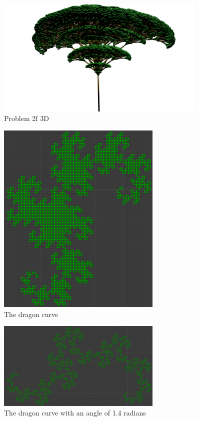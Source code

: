 \begin{figure}[H]
    \centering
    \includegraphics[width=0.90\textwidth]{figures/L-systems/f3d.png}
    \caption{Problem 2f 3D}\label{fig:prob2f_3d}
\end{figure}

\begin{figure}[H]
    \centering
    \includegraphics[width=0.7\textwidth]{figures/L-systems/dragon.png}
    \caption{The dragon curve}
\end{figure}

\begin{figure}[H]
    \centering
    \includegraphics[width=0.7\textwidth]{figures/L-systems/dragon-1_4rad.png}
    \caption{The dragon curve with an angle of 1.4 radians}
\end{figure}

